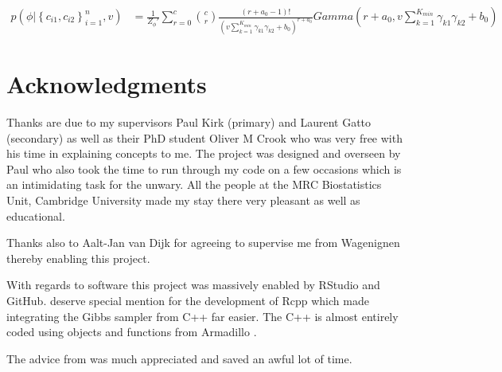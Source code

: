 \documentclass[11pt]{article} %
\begin{document}
\begin{align}
p(\phi |  \left\{c_{i1}, c_{i2}\right\}_{i=1}^n, v) &=  \frac{1}{Z_{\phi}'} \sum_{r=0}^c  \binom{c}{r} \frac{(r + a_0 - 1)!}{ \left(v \sum_{k=1}^{K_{min}} \gamma_{k1} \gamma_{k2} + b_0 \right)^{r + a_0}} Gamma \left(r+ a_0, v \sum_{k=1}^{K_{min}} \gamma_{k1} \gamma_{k2} + b_0 \right)
\end{align}

\section*{Acknowledgments}
Thanks are due to my supervisors Paul Kirk (primary) and Laurent Gatto (secondary) as well as their PhD student Oliver M Crook who was very free with his time in explaining concepts to me. The project was designed and overseen by Paul who also took the time to run through my code on a few occasions which is an intimidating task for the unwary. All the people at the MRC Biostatistics Unit, Cambridge University made my stay there very pleasant as well as educational.

Thanks also to Aalt-Jan van Dijk for agreeing to supervise me from Wagenignen thereby enabling this project.

With regards to software this project was massively enabled by RStudio \cite{RStudioTeamRStudioIntegratedDevelopment2016} and GitHub. \citet{EddelbuettelRcppSeamlessIntegration2011} deserve special mention for the development of Rcpp which made integrating the Gibbs sampler from C++ far easier. The C++ is almost entirely coded using objects and functions from Armadillo \cite{SandersonArmadillotemplatebasedlibrary2016}.

The advice from \citet{BryanExcusemeyou} was much appreciated and saved an awful lot of time. 

\newpage
%


\end{document}
